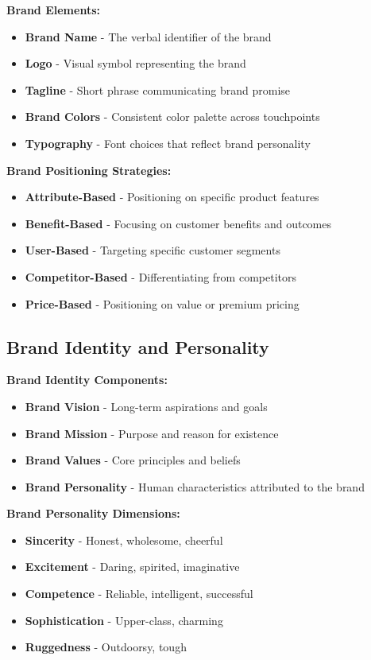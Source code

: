 \documentclass[12pt]{article}
\begin{document}
\textbf{Brand Elements:}
\begin{itemize}
    \item \textbf{Brand Name} - The verbal identifier of the brand
    \item \textbf{Logo} - Visual symbol representing the brand
    \item \textbf{Tagline} - Short phrase communicating brand promise
    \item \textbf{Brand Colors} - Consistent color palette across touchpoints
    \item \textbf{Typography} - Font choices that reflect brand personality
\end{itemize}

\textbf{Brand Positioning Strategies:}
\begin{itemize}
    \item \textbf{Attribute-Based} - Positioning on specific product features
    \item \textbf{Benefit-Based} - Focusing on customer benefits and outcomes
    \item \textbf{User-Based} - Targeting specific customer segments
    \item \textbf{Competitor-Based} - Differentiating from competitors
    \item \textbf{Price-Based} - Positioning on value or premium pricing
\end{itemize}

\subsection{Brand Identity and Personality}

\textbf{Brand Identity Components:}
\begin{itemize}
    \item \textbf{Brand Vision} - Long-term aspirations and goals
    \item \textbf{Brand Mission} - Purpose and reason for existence
    \item \textbf{Brand Values} - Core principles and beliefs
    \item \textbf{Brand Personality} - Human characteristics attributed to the brand
\end{itemize}

\textbf{Brand Personality Dimensions:}
\begin{itemize}
    \item \textbf{Sincerity} - Honest, wholesome, cheerful
    \item \textbf{Excitement} - Daring, spirited, imaginative
    \item \textbf{Competence} - Reliable, intelligent, successful
    \item \textbf{Sophistication} - Upper-class, charming
    \item \textbf{Ruggedness} - Outdoorsy, tough
\end{itemize}
\end{document}
